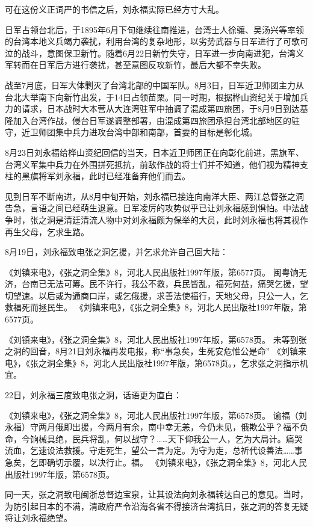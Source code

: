 \documentclass[12pt,UTF8]{ctexbook}
\begin{document}
可在这份义正词严的书信之后，刘永福实际已经方寸大乱。

日军占领台北后，于1895年6月下旬继续往南推进，台湾士人徐骧、吴汤兴等率领的台湾本地义兵竭力袭扰，利用台湾的复杂地形，以劣势武器与日军进行了可歌可泣的战斗，意图保卫新竹。随着6月22日新竹失守，日军进一步向南进犯，台湾义军转而在日军后方进行袭扰，甚至意图反攻新竹，最后大都不幸失败。

战至7月底，日军大体剿灭了台湾北部的中国军队。8月3日，日军近卫师团主力从台北大举南下向新竹出发，于14日占领苗栗。同一时期，根据桦山资纪关于增加兵力的请求，日本战时大本营从大连湾驻军中抽调了混成第四旅团，于8月9日到达基隆加入台湾作战，侵台日军遂调整部署，由混成第四旅团承担台湾北部地区的驻守，近卫师团集中兵力进攻台湾中部和南部，首要的目标是彰化城。

8月23日刘永福给桦山资纪回信的当天，日本近卫师团正在向彰化前进，黑旗军、台湾义军集中兵力在外围拼死抵抗，前敌作战的将士们并不知道，他们视为精神支柱的黑旗将军刘永福，此时已经准备弃他们而去。

见到日军不断南进，从8月中旬开始，刘永福已接连向南洋大臣、两江总督张之洞告急，言语之间已经萌生退意。日军凌厉的攻势似乎已让刘永福感到惧怕。中法战争时，张之洞是清廷清流人物中对刘永福颇为保举的大员，此时刘永福也将其视作再生父母，乞求生路。

8月19日，刘永福致电张之洞乞援，并乞求允许自己回大陆：

《刘镇来电》，《张之洞全集》8，河北人民出版社1997年版，第6577页。
闽粤饷无济，台南已无法可筹。民不许行，我公不救，兵民皆乱，福死何益，痛哭乞援，望切望速。以后或为通商口岸，或乞俄援，求善法使福行，天地父母，只公一人，乞救福死而拯民生。 《刘镇来电》，《张之洞全集》8，河北人民出版社1997年版，第6577页。

《刘镇来电》，《张之洞全集》8，河北人民出版社1997年版，第6578页。
未等到张之洞的回音，8月21日刘永福再发电报，称“事急矣，生死安危惟公是命” 《刘镇来电》，《张之洞全集》8，河北人民出版社1997年版，第6578页。，乞求张之洞指示机宜。

22日，刘永福三度致电张之洞，话语更为直白：

《刘镇来电》，《张之洞全集》8，河北人民出版社1997年版，第6578页。
谕福（刘永福）守两月俄即出援，今两月有余，南中幸无恙，今仍未见，俄欺公乎？福不负命，今饷械具绝，民兵将乱，何以战守？……天下仰我公一人，乞为大局计。痛哭流血，乞速设法救援。守走死生，望公一言为定。为守为走，总祈代设善法……事急矣，乞即确切示覆，以决行止。福。 《刘镇来电》，《张之洞全集》8，河北人民出版社1997年版，第6578页。

同一天，张之洞致电闽浙总督边宝泉，让其设法向刘永福转达自己的意见。当时，为防引起日本的不满，清政府严令沿海各省不得接济台湾抗日，张之洞的答复无疑将让刘永福绝望。
\end{document}
